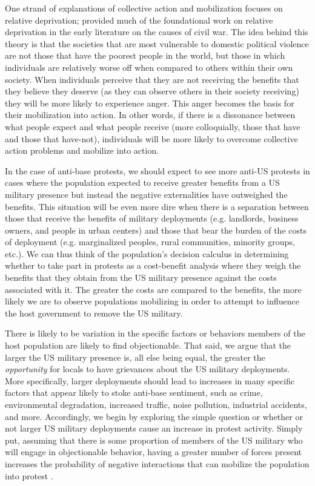 One strand of explanations of collective action and mobilization focuses on relative deprivation;  provided much of the foundational work on relative deprivation in the early literature on the causes of civil war.  The idea behind this theory is that the societies that are most vulnerable to domestic political violence are not those that have the poorest people in the world, but those in which individuals are relatively worse off when compared to others within their own society. When individuals perceive that they are not receiving the benefits that they believe they deserve (as they can observe others in their society receiving) they will be more likely to experience anger. This anger becomes the basis for their mobilization into action.  In other words, if there is a dissonance between what people expect and what people receive (more colloquially, those that have and those that have-not), individuals will be more likely to overcome collective action problems and mobilize into action. 

In the case of anti-base protests, we should expect to see more anti-US protests in cases where the population expected to receive greater benefits from a US military presence but instead the negative externalities have outweighed the benefits. This situation will be even more dire when there is a separation between those that receive the benefits of military deployments (e.g. landlords, business owners, and people in urban centers) and those that bear the burden of the costs of deployment (e.g. marginalized peoples, rural communities, minority groups, etc.). We can thus think of the population's decision calculus in determining whether to take part in protests as a cost-benefit analysis where they weigh the benefits that they obtain from the US military presence against the costs associated with it. The greater the costs are compared to the benefits, the more likely we are to observe populations mobilizing in order to attempt to influence the host government to remove the US military. 

There is likely to be variation in the specific factors or behaviors members of the host population are likely to find objectionable. That said, we argue that the larger the US military presence is, all else being equal, the greater the \textit{opportunity} for locals to have grievances about the US military deployments. More specifically, larger deployments should lead to increases in many specific factors that appear likely to stoke anti-base sentiment, such as crime, environmental degradation, increased traffic, noise pollution, industrial accidents, and more. Accordingly, we begin by exploring the simple question or whether or not larger US military deployments cause an increase in protest activity. Simply put, assuming that there is some proportion of members of the US military who will engage in objectionable behavior, having a greater number of forces present increases the probability of negative interactions that can mobilize the population into protest \cite{allenandflynn2013}.

